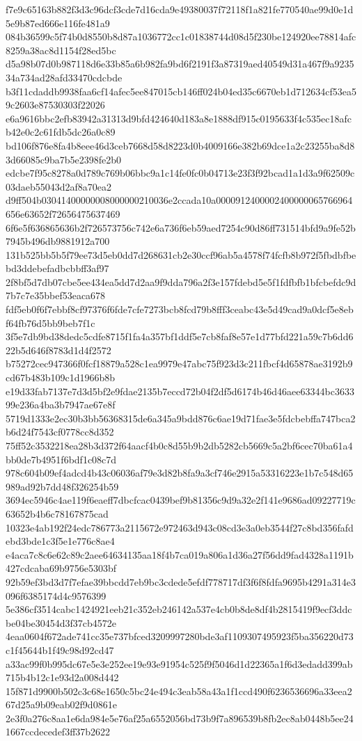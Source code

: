 {f7e9c65163b882f3d3c96dcf3cde7d16cda9e49380037f72118f1a821fe770540ae99d0e1d5e9b87ed666e116fe481a9
084b36599c5f74b0d8550b8d87a1036772cc1c01838744d08d5f230be124920ee78814afc8259a38ac8d1154f28ed5bc
d5a98b07d0b987118d6e33b85a6b982fa9bd6f2191f3a87319aed40549d31a467f9a923534a734ad28afd33470cdcbde
b3f11cdaddb9938faa6cf14afec5ee847015cb146ff024b04ed35c6670eb1d712634cf53ea59c2603e87530303f22026
e6a9616bbc2efb83942a31313d9bfd424640d183a8e1888df915c0195633f4c535ec18afcb42e0c2c61fdb5dc26a0c89
bd106f876e8fa4b8eee46d3ceb7668d58d8223d0b4009166e382b69dce1a2c23255ba8d83d66085c9ba7b5e2398fe2b0
edcbe7f95c8278a0d789c769b06bbc9a1c14fe0fc0b04713e23f3f92bcad1a1d3a9f62509c03daeb55043d2af8a70ea2
d9ff504b03041400000008000000210036e2ccada10a0000912400002400000065766964656e63652f72656475637469
6f6e5f636865636b2f726573756c742e6a736f6eb59aed7254c90d86ff731514bfd9a9fe52b7945b496db9881912a700
131b525bb5b5f79ee73d5eb0dd7d268631cb2e30ccf96ab5a4578f74fcfb8b972f5fbdbfbebd3ddebefadbcbbff3af97
2f8bf5d7db07cbe5ee434ea5dd7d2aa9f9dda796a2f3e157fdebd5e5f1fdfbfb1bfcbefdc9d7b7c7e35bbef53eaca678
fdf5eb0f6f7ebbf8cf97376f6fde7cfe7273bcb8fcd79b8fff3ceabc43e5d49cad9a0dcf5e8ebf64fb76d5bb9beb7f1c
3f5e7db9bd38dedc5cdfe8715f1fa4a357bf1ddf5e7cb8faf8e57e1d77bfd221a59c7b6dd622b5d646f8783d1d4f2572
b75272cec947366f0fcf18879a528c1ea9979e47abc75f923d3c211fbcf4d65878ae3192b9cd67b483b109c1d1966b8b
e19d33fab7137e7d3d5bf2e9fdae2135b7eccd72b04f2df5d6174b46d46aee63344bc363399e236a4ba3b7947ae67e8f
5719d1333e2ec30b3bb56368315de6a345a9bdd876c6ae19d71fae3e5fdcbebffa747bca2b6d24f7543cf0778cc8d352
75ff52c3532218ea28b3d372f64aacf4b0c8d55b9b2db5282cb5669c5a2bf6cec70ba61a4bb0de7b4951f6bdf1c08c7d
978c604b09ef4adcd4b43c06036af79e3d82b8fa9a3cf746e2915a53316223e1b7c548d65989ad92b7dd48f326254b59
3694ec5946c4ae119f6eaeff7dbcfcac0439bef9b81356c9d9a32e2f141e9686ad09227719c63652b4b6c78167875cad
10323e4ab192f24edc786773a2115672e972463d943c08cd3e3a0eb3544f27c8bd356fafdebd3bde1c3f5e1e776c8ae4
e4aca7c8c6e62c89c2aee64634135aa18f4b7ca019a806a1d36a27f56dd9fad4328a1191b427cdcaba69b9756e5303bf
92b59ef3bd3d7f7efae39bbcdd7eb9bc3cdede5efdf778717df3f6f8fdfa9695b4291a314e3096f6385174d4c9576399
5e386cf3514cabc1424921eeb21c352eb246142a537e4cb0b8de8df4b2815419f9ecf3ddcbe04be30454d3f37cb4572e
4eaa0604f672ade741cc35e737bfced3209997280bde3af1109307495923f5ba356220d73c1f45644b1f49c98d92cd47
a33ac99f0b995dc67e5e3e252ee19e93e91954c525f9f5046d1d22365a1f6d3edadd399ab715b4b12c1e93d2a008d442
15f871d9900b502c3c68e1650c5bc24e494c3eab58a43a1f1ccd490f6236536696a33eea267d25a9b09eab02f9d0861e
2e3f0a276c8aa1e6da984e5e76af25a6552056bd73b9f7a896539b8fb2ec8ab0448b5ee241667ccdecedef3ff37b2622
}
